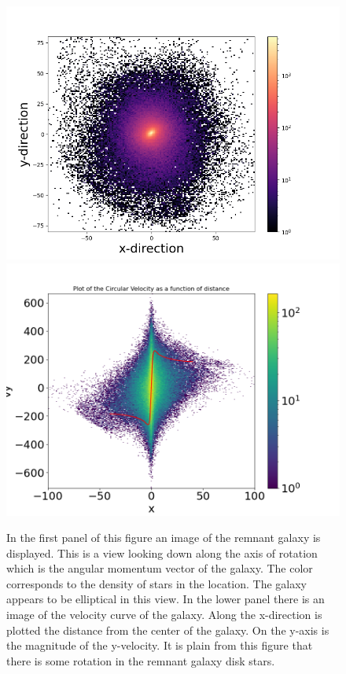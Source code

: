 \documentclass[fleqn,usenatbib]{mnras}
\begin{document}
 \begin{figure}
     \centering
     \includegraphics[scale=0.47]{Figures/Galaxy_Figure.png}
     \includegraphics[scale=0.42]{Figures/Rotation_Velocity_Figure.png}
     \caption{In the first panel of this figure an image of the remnant galaxy is displayed. This is a view looking down along the axis of rotation which is the angular momentum vector of the galaxy. The color corresponds to the density of stars in the location. The galaxy appears to be elliptical in this view.
     In the lower panel there is an image of the velocity curve of the galaxy. Along the x-direction is plotted the distance from the center of the galaxy. On the y-axis is the magnitude of the y-velocity. It is plain from this figure that there is some rotation in the remnant galaxy disk stars.}
     \label{Galaxy_image}
 \end{figure}
\end{document}
